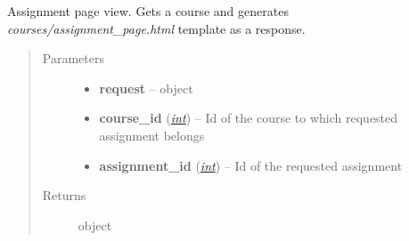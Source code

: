\documentclass[letterpaper,10pt,english]{sphinxmanual}
\begin{document}
\begin{fulllineitems}
\label{web_portal:core.courses.views.assignment_page}
Assignment page view. Gets a course and generates \emph{courses/assignment\_page.html}
template as a response.
\begin{quote}\begin{description}
\item[{Parameters}] \leavevmode\begin{itemize}
\item {} 
\textbf{request} --  object

\item {} 
\textbf{course\_id} (\href{http://docs.python.org/library/functions.html\#int}{\emph{int}}) -- Id of the course to which requested assignment belongs

\item {} 
\textbf{assignment\_id} (\href{http://docs.python.org/library/functions.html\#int}{\emph{int}}) -- Id of the requested assignment

\end{itemize}

\item[{Returns}] \leavevmode
{} object

\end{description}\end{quote}

\end{fulllineitems}

\end{document}

